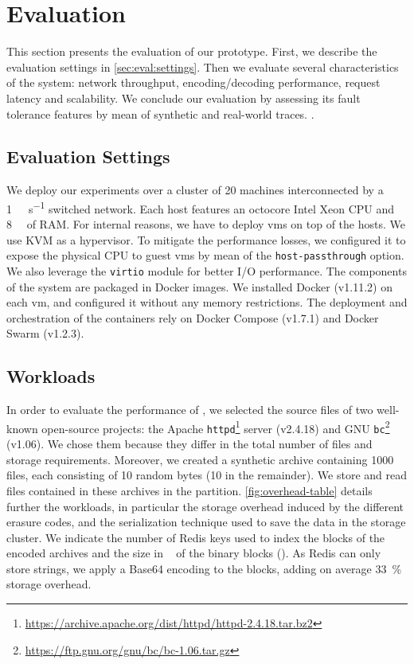 \section{Evaluation}
\label{sec:evaluation}

This section presents the evaluation of our \SYS prototype. 
First, we describe the evaluation settings in \autoref{sec:eval:settings}.
Then we evaluate several characteristics of the system: network throughput, encoding/decoding performance, request latency and scalability.
We conclude our evaluation by assessing its fault tolerance features by mean of synthetic and real-world traces.
.

\subsection{Evaluation Settings}
\label{sec:eval:settings}

We deploy our experiments over a cluster of \num{20} machines interconnected by a \SI{1}{\giga\bit\per\second} switched network.
Each host features an octocore Intel Xeon CPU and \SI{8}{\giga\byte} of RAM.
For internal reasons, we have to deploy \acp{vm} on top of the hosts.
We use KVM as a hypervisor.
To mitigate the performance losses, we configured it to expose the physical CPU to guest \acp{vm} by mean of the \texttt{host-passthrough} option.
We also leverage the \texttt{virtio} module for better I/O performance.
The components of the system are packaged in Docker images.
We installed Docker (v1.11.2) on each \ac{vm}, and configured it without any memory restrictions.
The deployment and orchestration of the containers rely on Docker Compose (v1.7.1) and Docker Swarm (v1.2.3).

\subsection{Workloads}
\label{sec:eval:workloads}
In order to evaluate the performance of \SYS, we selected the source files of two well-known open-source projects: the Apache \texttt{httpd}\footnote{\url{https://archive.apache.org/dist/httpd/httpd-2.4.18.tar.bz2}} server (v2.4.18) and GNU \texttt{bc}\footnote{\url{https://ftp.gnu.org/gnu/bc/bc-1.06.tar.gz}} (v1.06). 
We chose them because they differ in the total number of files and storage requirements.
Moreover, we created a synthetic archive containing 1000 files, each consisting of 10 random bytes (\SI{10}{\byte} in the remainder).
We store and read files contained in these archives in the \SYS partition. 
\autoref{fig:overhead-table} details further the workloads, in particular the storage overhead induced by the different erasure codes, and the serialization technique used to save the data in the storage cluster.
We indicate the number of Redis keys used to index the blocks of the encoded archives and the size in \si{\mega\byte} of the binary blocks (). 
As Redis can only store strings, we apply a Base64 encoding to the blocks, adding on average \SI{33}{\percent} storage overhead.

